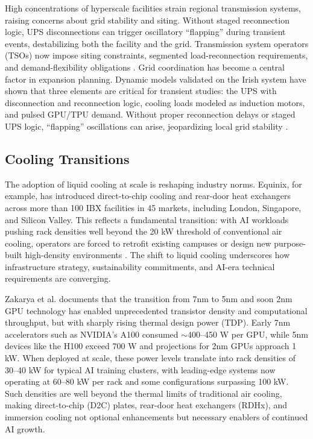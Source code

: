 \documentclass[conference]{IEEEtran}
\begin{document}
High concentrations of hyperscale facilities strain regional transmission systems, raising concerns about grid stability and siting. Without staged reconnection logic, UPS disconnections can trigger oscillatory ``flapping'' during transient events, destabilizing both the facility and the grid. Transmission system operators (TSOs) now impose siting constraints, segmented load-reconnection requirements, and demand-flexibility obligations \cite{Zakarya2024}. Grid coordination has become a central factor in expansion planning. Dynamic models validated on the Irish system have shown that three elements are critical for transient studies: the UPS with disconnection and reconnection logic, cooling loads modeled as induction motors, and pulsed GPU/TPU demand. Without proper reconnection delays or staged UPS logic, ``flapping'' oscillations can arise, jeopardizing local grid stability \cite{Zakarya2024}.

\subsection{Cooling Transitions}

The adoption of liquid cooling at scale is reshaping industry norms. Equinix, for example, has introduced direct-to-chip cooling and rear-door heat exchangers across more than 100 IBX facilities in 45 markets, including London, Singapore, and Silicon Valley. This reflects a fundamental transition: with AI workloads pushing rack densities well beyond the 20 kW threshold of conventional air cooling, operators are forced to retrofit existing campuses or design new purpose-built high-density environments \cite{Zakarya2024}. The shift to liquid cooling underscores how infrastructure strategy, sustainability commitments, and AI-era technical requirements are converging.

Zakarya et al. \cite{Zakarya2024} documents that the transition from 7nm to 5nm and soon 2nm GPU technology has enabled unprecedented transistor density and computational throughput, but with sharply rising thermal design power (TDP). Early 7nm accelerators such as NVIDIA's A100 consumed $\sim$400--450 W per GPU, while 5nm devices like the H100 exceed 700 W and projections for 2nm GPUs approach 1 kW. When deployed at scale, these power levels translate into rack densities of 30--40 kW for typical AI training clusters, with leading-edge systems now operating at 60--80 kW per rack and some configurations surpassing 100 kW. Such densities are well beyond the thermal limits of traditional air cooling, making direct-to-chip (D2C) plates, rear-door heat exchangers (RDHx), and immersion cooling not optional enhancements but necessary enablers of continued AI growth.
\end{document}
